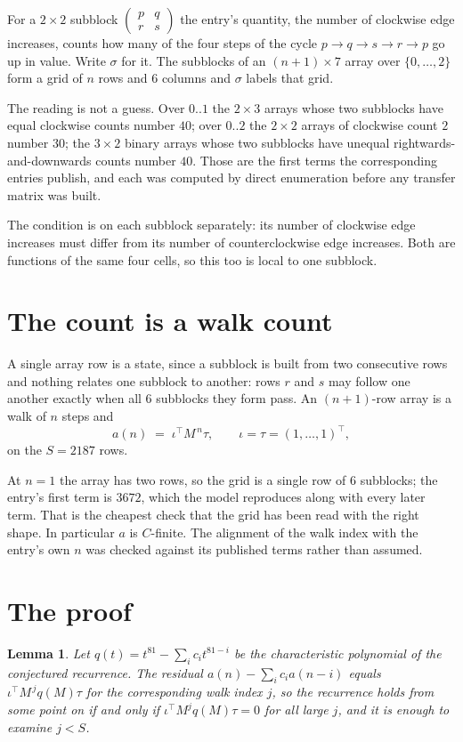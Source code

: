 \documentclass[11pt,a4paper]{article}
\theoremstyle{plain}
\newtheorem{lemma}[theorem]{Lemma}
\theoremstyle{definition}
\begin{document}
For a $2\times2$ subblock $\begin{pmatrix}p&q\\r&s\end{pmatrix}$ the
entry's quantity, the number of clockwise edge increases, counts how many of the four steps of the cycle $p\to q\to s\to r\to p$ go up in value. Write $\sigma$ for it. The subblocks of an
$(n+1)\times7$ array over $\{0,\dots,2\}$ form a grid of $n$ rows and $6$
columns and $\sigma$ labels that grid.

The reading is not a guess. Over $0..1$ the $2\times3$ arrays whose two subblocks have equal
clockwise counts number $40$; over $0..2$ the $2\times2$ arrays of clockwise count $2$ number
$30$; the $3\times2$ binary arrays whose two subblocks have unequal rightwards-and-downwards
counts number $40$. Those are the first terms the corresponding entries publish, and each was
computed by direct enumeration before any transfer matrix was built.

The condition is on each subblock separately: its number of clockwise edge increases must differ from its number
of counterclockwise edge increases. Both are functions of the same four cells, so this too is local to one
subblock.

\section{The count is a walk count}

A single array row is a state, since a subblock is built from two
consecutive rows and nothing relates one subblock to another: rows $r$ and $s$ may follow one
another exactly when all $6$ subblocks they form pass. An $(n+1)$-row array is a walk of $n$
steps and
\[
a(n)\;=\;\iota^{\!\top}M^{\,n}\tau,\qquad\iota=\tau=(1,\dots,1)^{\!\top},
\]
on the $S=2187$ rows.

At $n=1$ the array has two rows, so the grid is a single row of $6$
subblocks; the entry's first term is $3672$, which the model
reproduces along with every later term. That is the cheapest check that the grid has been read
with the right shape.
In particular $a$ is $C$-finite. The alignment of the walk index with the entry's own $n$ was
checked against its published terms rather than assumed.

\section{The proof}

\begin{lemma}\label{lem:crit}
Let $q(t)=t^{81}-\sum_i c_it^{81-i}$ be the characteristic polynomial of the
conjectured recurrence. The residual $a(n)-\sum_ic_ia(n-i)$ equals
$\iota^{\!\top}M^{\,j}q(M)\tau$ for the corresponding walk index $j$, so the recurrence
holds from some point on if and only if $\iota^{\!\top}M^{j}q(M)\tau=0$ for all large $j$,
and it is enough to examine $j<S$.
\end{lemma}
\end{document}
